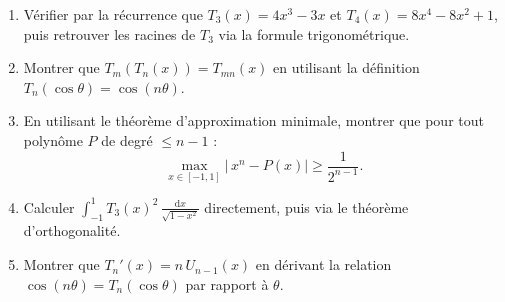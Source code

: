 \begin{mdframed}[style=exobar]
  \begin{enumerate}
    \item Vérifier par la récurrence que $T_3(x) = 4x^3 - 3x$ et
          $T_4(x) = 8x^4 - 8x^2 + 1$, puis retrouver les racines de $T_3$
          via la formule trigonométrique.

    \item Montrer que $T_m(T_n(x)) = T_{mn}(x)$ en utilisant la définition
          $T_n(\cos\theta)=\cos(n\theta)$.

    \item En utilisant le théorème d'approximation minimale, montrer que
          pour tout polynôme $P$ de degré $\leq n-1$ :
          \[
            \max_{x\in[-1,1]}\left|\,x^n - P(x)\right| \geq \frac{1}{2^{n-1}}.
          \]

    \item Calculer $\int_{-1}^1 {T_3(x)}^2\,\frac{\mathrm{d}x}{\sqrt{1-x^2}}$
          directement, puis via le théorème d'orthogonalité.

    \item Montrer que $T_n'(x) = n\,U_{n-1}(x)$ en dérivant la relation
          $\cos(n\theta) = T_n(\cos\theta)$ par rapport à $\theta$.
  \end{enumerate}
\end{mdframed}

